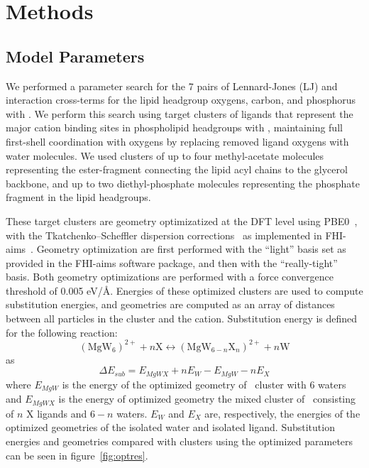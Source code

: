 \section{Methods}
\subsection{\mg{} Model Parameters}

We performed a parameter search for the 7 pairs of Lennard-Jones (LJ) \sigmaij{} and \epsilonij{} interaction
cross-terms for the lipid headgroup oxygens, carbon, and phosphorus with \mg{}.
We perform this search using target
clusters of ligands that represent the major cation binding sites in phospholipid headgroups with \mg{},
maintaining full first-shell coordination with oxygens by replacing removed ligand oxygens with water molecules.
We used clusters of up to four methyl-acetate molecules representing the ester-fragment
connecting the lipid acyl chains to the glycerol backbone, and up to two diethyl-phosphate molecules representing the
phosphate fragment in the lipid headgroups.

These target clusters are geometry optimizatized at the DFT level using PBE0~\cite{adamo:1999:toward},
with the Tkatchenko–Scheffler
dispersion corrections~\cite{tkatchenko:2009} as implemented in FHI-aims~\cite{fhiaims}.
Geometry optimization are first performed with the ``light'' basis set as provided in the
FHI-aims software package, and then with the ``really-tight'' basis. Both
geometry optimizations are performed with a force
convergence threshold of 0.005 eV/\AA. Energies of these optimized clusters are used to compute substitution energies, and
geometries are computed as an array of distances between all particles in the cluster and the cation.
Substitution energy is defined for the following reaction:
\begin{equation}
(\mathrm{Mg} \mathrm{W}_{6})^{2+} + n\mathrm{X} \longleftrightarrow (\mathrm{Mg} \mathrm{W}_{6-n} \mathrm{X}_n)^{2+} + n\mathrm{W}
\end{equation}
as
\begin{equation}
\Delta E_{sub} = E_{MgWX} + nE_{W} - E_{MgW} - nE_{X}
\end{equation}
where $E_{MgW}$ is the energy of the optimized geometry of \mg~cluster with 6 waters and $E_{MgWX}$ is the energy of optimized geometry the mixed cluster of \mg~consisting of $n$ X ligands and $6-n$ waters. $E_{W}$ and $E_X$ are, respectively, the energies of the optimized geometries of the isolated water and isolated ligand.
Substitution energies and geometries compared with clusters using the optimized parameters can be seen in figure~\ref{fig:optres}.


